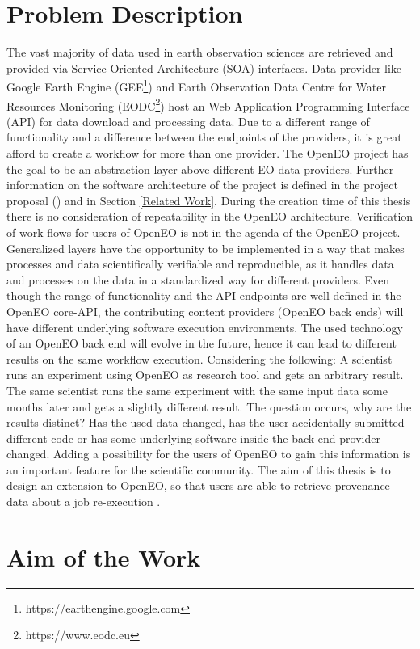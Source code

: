 \documentclass[draft,final]{vutinfth} %
\begin{document}
\section{Problem Description}\label{Problem}
The vast majority of data used in earth observation sciences are retrieved and provided via Service Oriented Architecture (SOA) interfaces. Data provider like Google Earth Engine (GEE\footnote{https://earthengine.google.com}) and Earth Observation Data Centre for Water Resources Monitoring (EODC\footnote{https://www.eodc.eu}) host an Web Application Programming Interface (API) for data download and processing data. Due to a different range of functionality and a difference between the endpoints of the providers, it is great afford to create a workflow for more than one provider. The OpenEO project has the goal to be an abstraction layer above different EO data providers. Further information on the software architecture of the project is defined in the project proposal (\cite{openeo}) and in Section \ref{Related Work}. During the creation time of this thesis there is no consideration of repeatability in the OpenEO architecture. Verification of work-flows for users of OpenEO is not in the agenda of the OpenEO project. Generalized layers have the opportunity to be implemented in a way that makes processes and data scientifically verifiable and reproducible, as it handles data and processes on the data in a standardized way for different providers. Even though the range of functionality and the API endpoints are well-defined in the OpenEO core-API, the contributing content providers (OpenEO back ends) will have different underlying software execution environments. The used technology of an OpenEO back end will evolve in the future, hence it can lead to different results on the same workflow execution. Considering the following: A scientist runs an experiment using OpenEO as research tool and gets an arbitrary result. The same scientist runs the same experiment with the same input data some months later and gets a slightly different result. The question occurs, why are the results distinct? Has the used data changed, has the user accidentally submitted different code or has some underlying software inside the back end provider changed. Adding a possibility for the users of OpenEO to gain this information is an important feature for the scientific community. The aim of this thesis is to design an extension to OpenEO, so that users are able to retrieve provenance data about a job re-execution \cite{openeo}. 

\section{Aim of the Work}\label{Aim}
\end{document}
